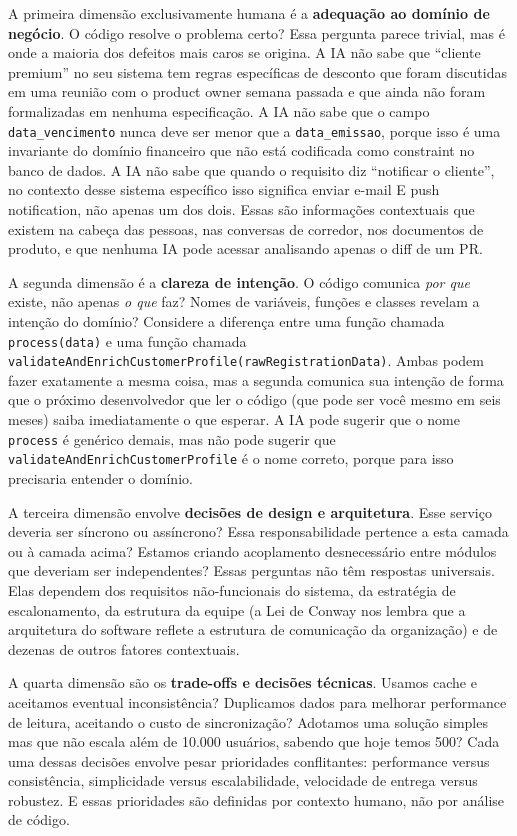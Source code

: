 A primeira dimensão exclusivamente humana é a \textbf{adequação ao domínio de
negócio}. O código resolve o problema certo? Essa pergunta parece trivial, mas é onde
a maioria dos defeitos mais caros se origina. A IA não sabe que ``cliente
premium'' no seu sistema tem regras específicas de desconto que foram discutidas em
uma reunião com o product owner semana passada e que ainda não foram formalizadas em
nenhuma especificação. A IA não sabe que o campo \texttt{data\_vencimento} nunca
deve ser menor que a \texttt{data\_emissao}, porque isso é uma invariante do domínio
financeiro que não está codificada como constraint no banco de dados. A IA não sabe
que quando o requisito diz ``notificar o cliente'', no contexto desse sistema
específico isso significa enviar e-mail E push notification, não apenas um dos dois.
Essas são informações contextuais que existem na cabeça das pessoas, nas conversas
de corredor, nos documentos de produto, e que nenhuma IA pode acessar analisando
apenas o diff de um PR.

A segunda dimensão é a \textbf{clareza de intenção}. O código comunica \textit{por
que} existe, não apenas \textit{o que} faz? Nomes de variáveis, funções e classes
revelam a intenção do domínio? Considere a diferença entre uma função chamada
\texttt{process(data)} e uma função chamada
\texttt{validateAndEnrichCustomerProfile(rawRegistrationData)}. Ambas podem fazer
exatamente a mesma coisa, mas a segunda comunica sua intenção de forma que o próximo
desenvolvedor que ler o código (que pode ser você mesmo em seis meses) saiba
imediatamente o que esperar. A IA pode sugerir que o nome \texttt{process} é
genérico demais, mas não pode sugerir que
\texttt{validateAndEnrichCustomerProfile} é o nome correto, porque para isso
precisaria entender o domínio.

A terceira dimensão envolve \textbf{decisões de design e arquitetura}. Esse serviço
deveria ser síncrono ou assíncrono? Essa responsabilidade pertence a esta camada ou à
camada acima? Estamos criando acoplamento desnecessário entre módulos que deveriam ser
independentes? Essas perguntas não têm respostas universais. Elas dependem dos
requisitos não-funcionais do sistema, da estratégia de escalonamento, da estrutura da
equipe (a Lei de Conway nos lembra que a arquitetura do software reflete a estrutura
de comunicação da organização) e de dezenas de outros fatores contextuais.

A quarta dimensão são os \textbf{trade-offs e decisões técnicas}. Usamos cache e
aceitamos eventual inconsistência? Duplicamos dados para melhorar performance de
leitura, aceitando o custo de sincronização? Adotamos uma solução simples mas que
não escala além de 10.000 usuários, sabendo que hoje temos 500? Cada uma dessas
decisões envolve pesar prioridades conflitantes: performance versus consistência,
simplicidade versus escalabilidade, velocidade de entrega versus robustez. E essas
prioridades são definidas por contexto humano, não por análise de código.

